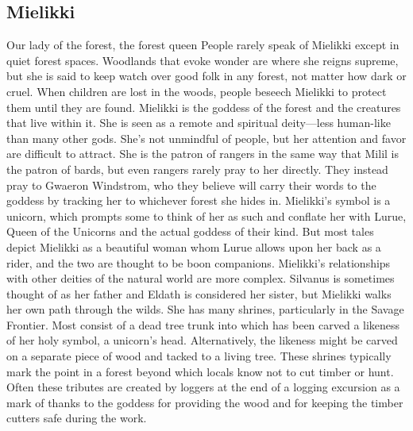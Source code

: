 \documentclass[10pt,a4paper,twoside,twocolumn,openany,bg=print,nodeprecatedcode]{dndbook}
\begin{document}
\subsection{Mielikki}
Our lady of the forest, the forest queen
People rarely speak of Mielikki except in quiet forest spaces. Woodlands that evoke wonder are where she reigns supreme, but she is said to keep watch over good folk in any forest, not matter how dark or cruel. When children are lost in the woods, people beseech Mielikki to protect them until they are found.
Mielikki is the goddess of the forest and the creatures that live within it. She is seen as a remote and spiritual deity—less human-like than many other gods. She's not unmindful of people, but her attention and favor are difficult to attract. She is the patron of rangers in the same way that Milil is the patron of bards, but even rangers rarely pray to her directly. They instead pray to Gwaeron Windstrom, who they believe will carry their words to the goddess by tracking her to whichever forest she hides in.
Mielikki's symbol is a unicorn, which prompts some to think of her as such and conflate her with Lurue, Queen of the Unicorns and the actual goddess of their kind. But most tales depict Mielikki as a beautiful woman whom Lurue allows upon her back as a rider, and the two are thought to be boon companions. Mielikki's relationships with other deities of the natural world are more complex. Silvanus is sometimes thought of as her father and Eldath is considered her sister, but Mielikki walks her own path through the wilds.
She has many shrines, particularly in the Savage Frontier. Most consist of a dead tree trunk into which has been carved a likeness of her holy symbol, a unicorn's head. Alternatively, the likeness might be carved on a separate piece of wood and tacked to a living tree. These shrines typically mark the point in a forest beyond which locals know not to cut timber or hunt. Often these tributes are created by loggers at the end of a logging excursion as a mark of thanks to the goddess for providing the wood and for keeping the timber cutters safe during the work.
\end{document}
